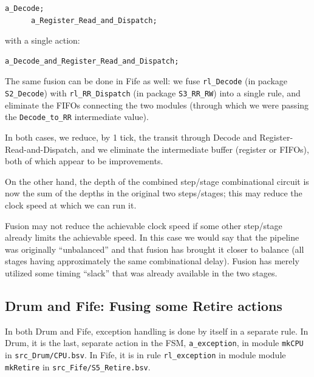 {\small
\begin{Verbatim}[frame=single]
      a_Decode;
      a_Register_Read_and_Dispatch;
\end{Verbatim}
}

with a single action:

{\small
\begin{Verbatim}[frame=single]
      a_Decode_and_Register_Read_and_Dispatch;
\end{Verbatim}
}

The same fusion can be done in Fife as well: we fuse \verb|rl_Decode|
(in package \verb|S2_Decode|) with \verb|rl_RR_Dispatch| (in package
\verb|S3_RR_RW|) into a single rule, and eliminate the FIFOs
connecting the two modules (through which we were passing the
\verb|Decode_to_RR| intermediate value).

In both cases, we reduce, by 1 tick, the transit through Decode and
Register-Read-and-Dispatch, and we eliminate the intermediate buffer
(register or FIFOs), both of which appear to be improvements.

On the other hand, the depth of the combined step/stage combinational
circuit is now the sum of the depths in the original two steps/stages;
this may reduce the clock speed at which we can run it.


Fusion may not reduce the achievable clock speed if some other
step/stage already limits the achievable speed.  In this case we would
say that the pipeline was originally ``unbalanced'' and that fusion
has brought it closer to balance (all stages having approximately the
same combinational delay).  Fusion has merely utilized some timing
``slack'' that was already available in the two stages.


\subsection{Drum and Fife: Fusing some Retire actions}

In both Drum and Fife, exception handling is done by itself in a
separate rule.  In Drum, it is the last, separate action in the FSM,
\verb|a_exception|, in module \verb|mkCPU| in \verb|src_Drum/CPU.bsv|.
In Fife, it is in rule \verb|rl_exception| in module module
\verb|mkRetire| in \verb|src_Fife/S5_Retire.bsv|.

